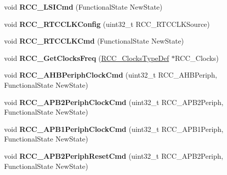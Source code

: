 \begin{DoxyCompactItemize}
\item 
\hypertarget{group__RCC__Exported__Functions_ga81e3ca29fd154ac2019bba6936d6d5ed}{
void {\bfseries RCC\_\-LSICmd} (FunctionalState NewState)}
\label{group__RCC__Exported__Functions_ga81e3ca29fd154ac2019bba6936d6d5ed}

\item 
\hypertarget{group__RCC__Exported__Functions_ga1473d8a5a020642966359611c44181b0}{
void {\bfseries RCC\_\-RTCCLKConfig} (uint32\_\-t RCC\_\-RTCCLKSource)}
\label{group__RCC__Exported__Functions_ga1473d8a5a020642966359611c44181b0}

\item 
\hypertarget{group__RCC__Exported__Functions_ga9802f84846df2cea8e369234ed13b159}{
void {\bfseries RCC\_\-RTCCLKCmd} (FunctionalState NewState)}
\label{group__RCC__Exported__Functions_ga9802f84846df2cea8e369234ed13b159}

\item 
\hypertarget{group__RCC__Exported__Functions_ga3e9944fd1ed734275222bbb3e3f29993}{
void {\bfseries RCC\_\-GetClocksFreq} (\hyperlink{structRCC__ClocksTypeDef}{RCC\_\-ClocksTypeDef} $\ast$RCC\_\-Clocks)}
\label{group__RCC__Exported__Functions_ga3e9944fd1ed734275222bbb3e3f29993}

\item 
\hypertarget{group__RCC__Exported__Functions_gae0b30d8598b8393bdba9c3fefba3a968}{
void {\bfseries RCC\_\-AHBPeriphClockCmd} (uint32\_\-t RCC\_\-AHBPeriph, FunctionalState NewState)}
\label{group__RCC__Exported__Functions_gae0b30d8598b8393bdba9c3fefba3a968}

\item 
\hypertarget{group__RCC__Exported__Functions_ga56ff55caf8d835351916b40dd030bc87}{
void {\bfseries RCC\_\-APB2PeriphClockCmd} (uint32\_\-t RCC\_\-APB2Periph, FunctionalState NewState)}
\label{group__RCC__Exported__Functions_ga56ff55caf8d835351916b40dd030bc87}

\item 
\hypertarget{group__RCC__Exported__Functions_gaee7cc5d73af7fe1986fceff8afd3973e}{
void {\bfseries RCC\_\-APB1PeriphClockCmd} (uint32\_\-t RCC\_\-APB1Periph, FunctionalState NewState)}
\label{group__RCC__Exported__Functions_gaee7cc5d73af7fe1986fceff8afd3973e}

\item 
\hypertarget{group__RCC__Exported__Functions_gad94553850ac07106a27ee85fec37efdf}{
void {\bfseries RCC\_\-APB2PeriphResetCmd} (uint32\_\-t RCC\_\-APB2Periph, FunctionalState NewState)}
\label{group__RCC__Exported__Functions_gad94553850ac07106a27ee85fec37efdf}


\end{DoxyCompactItemize}
